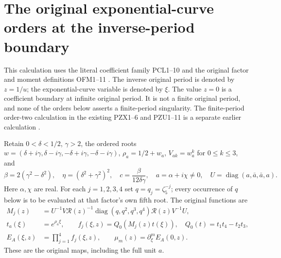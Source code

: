 \section{The original exponential-curve orders at the inverse-period boundary}
This calculation uses the literal coefficient family PCL1--10 and the
original factor and moment definitions OFM1--11
\cite{PCLOriginal,NC,Cumulative}. The inverse original period is denoted
by $z=1/u$; the exponential-curve variable is denoted by $\xi$.
The value $z=0$ is a coefficient boundary at infinite original period.
It is not a finite original period, and none of the orders below asserts
a finite-period singularity. The finite-period order-two calculation in
the existing PZX1--6 and PZU1--11 is a separate earlier calculation
\cite{PeriodZeroOriginal}.

Retain $0<\delta<1/2$, $\gamma>2$, the ordered roots
$w=(\delta+i\gamma,\delta-i\gamma,-\delta+i\gamma,-\delta-i\gamma)$,
$\rho_a=1/2+w_a$, $V_{ak}=w_a^k$ for $0\le k\le3$, and
\[
 \beta=2(\gamma^2-\delta^2),\quad
 \eta=(\delta^2+\gamma^2)^2,\quad c=\frac{\beta}{12\delta\gamma},
 \quad a=\alpha+i\chi\ne0,\quad
 U=\operatorname{diag}(a,\bar a,\bar a,a).
 \tag{OPB1}
\]
Here $\alpha,\chi$ are real. For each $j=1,2,3,4$ set
$q=q_j=\zeta_5^{-j}$; every occurrence of $q$ below is to be evaluated
at that factor's own fifth root. The original functions are
\[
 \begin{split}
 M_j(z)&=U^{-1}V\mathcal R(z)^{-1}
        \operatorname{diag}(q,q^2,q^3,q^4)\mathcal R(z)V^{-1}U,\\
 t_a(\xi)&=e^{\rho_a\xi},\qquad
 f_j(\xi,z)=Q_0(M_j(z)t(\xi)),\quad Q_0(t)=t_1t_4-t_2t_3,\\
 E_A(\xi,z)&=\prod_{j=1}^4f_j(\xi,z),\qquad
 \mu_m(z)=\partial_\xi^m E_A(0,z).
 \end{split}\tag{OPB2}
\]
These are the original maps, including the full unit $a$.


